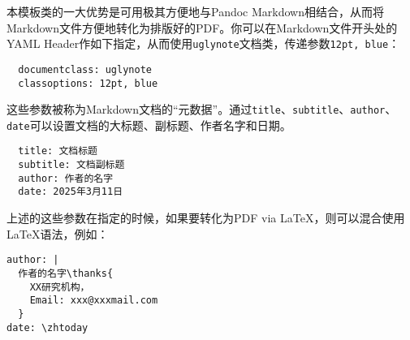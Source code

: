 本模板类的一大优势是可用极其方便地与Pandoc Markdown相结合，从而将Markdown文件方便地转化为排版好的PDF。你可以在Markdown文件开头处的YAML Header作如下指定，从而使用\texttt{uglynote}文档类，传递参数\texttt{12pt, blue}：

\begin{verbatim}
  documentclass: uglynote
  classoptions: 12pt, blue
\end{verbatim}

这些参数被称为Markdown文档的“元数据”。通过\texttt{title}、\texttt{subtitle}、\texttt{author}、\texttt{date}可以设置文档的大标题、副标题、作者名字和日期。

\begin{verbatim}
  title: 文档标题
  subtitle: 文档副标题
  author: 作者的名字
  date: 2025年3月11日
\end{verbatim}

\begin{note}
上述的这些参数在指定的时候，如果要转化为PDF via \LaTeX{}，则可以混合使用\LaTeX{}语法，例如：

\begin{verbatim}
author: |
  作者的名字\thanks{
    XX研究机构，
    Email: xxx@xxxmail.com
  }
date: \zhtoday
\end{verbatim}

\end{note}
